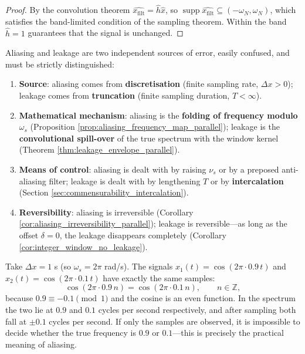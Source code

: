 \begin{proof}
By the convolution theorem $\widehat{x_{\text{filt}}}=\hat h\hat x$, so $\operatorname{supp}\widehat{x_{\text{filt}}}\subseteq(-\omega_N,\omega_N)$, which satisfies the band-limited condition of the sampling theorem. Within the band $\hat h=1$ guarantees that the signal is unchanged.
\end{proof}

\begin{remark}\label{rem:aliasing_vs_leakage}
Aliasing and leakage are two independent sources of error, easily confused, and must be strictly distinguished:
\begin{enumerate}[label=(\roman*)]
    \item \textbf{Source}: aliasing comes from \textbf{discretisation} (finite sampling rate, $\Delta x>0$); leakage comes from \textbf{truncation} (finite sampling duration, $T<\infty$).
    \item \textbf{Mathematical mechanism}: aliasing is the \textbf{folding of frequency modulo $\omega_s$} (Proposition \ref{prop:aliasing_frequency_map_parallel}); leakage is the \textbf{convolutional spill-over} of the true spectrum with the window kernel (Theorem \ref{thm:leakage_envelope_parallel}).
    \item \textbf{Means of control}: aliasing is dealt with by raising $\nu_s$ or by a preposed anti-aliasing filter; leakage is dealt with by lengthening $T$ or by \textbf{intercalation} (Section \ref{sec:commensurability_intercalation}).
    \item \textbf{Reversibility}: aliasing is irreversible (Corollary \ref{cor:aliasing_irreversibility_parallel}); leakage is reversible---as long as the offset $\delta=0$, the leakage disappears completely (Corollary \ref{cor:integer_window_no_leakage}).
\end{enumerate}
\end{remark}

\begin{example}\label{ex:aliasing_numeric}
Take $\Delta x=1$ s (so $\omega_s=2\pi$ rad/s). The signals $x_1(t)=\cos(2\pi\cdot0.9\,t)$ and $x_2(t)=\cos(2\pi\cdot0.1\,t)$ have exactly the same samples:
\[
\cos(2\pi\cdot0.9\,n)=\cos(2\pi\cdot0.1\,n),\qquad n\in\mathbb{Z},
\]
because $0.9\equiv-0.1\pmod1$ and the cosine is an even function. In the spectrum the two lie at $0.9$ and $0.1$ cycles per second respectively, and after sampling both fall at $\pm0.1$ cycles per second. If only the samples are observed, it is impossible to decide whether the true frequency is $0.9$ or $0.1$---this is precisely the practical meaning of aliasing.
\end{example}

